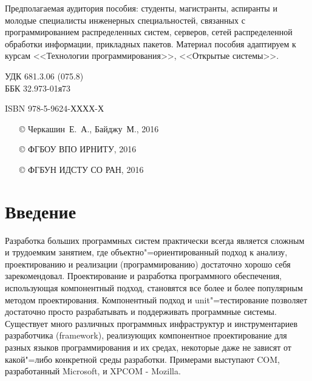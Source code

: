 \documentclass[a4paper,openany,twoside,draft]{book}
\newcommand\e[1]{#1}
\begin{document}
\begin{mygroup}
\begin{minipage}[t]{0.95\linewidth}
Предполагаемая аудитория пособия: студенты, магистранты, аспиранты и молодые специалисты инженерных специальностей, связанных с программированием распределенных систем, серверов, сетей распределенной обработки информации, прикладных пакетов. Материал пособия адаптируем к курсам <<Технологии программирования>>, <<Открытые системы>>.

\mbox{}
\endgroup
\end{minipage}
\mbox{}\hspace{0.7\linewidth}
\begin{minipage}{0.3\linewidth}\small
\noindent УДК 681.3.06 (075.8)\\
\noindent ББК 32.973-01я73
\end{minipage}
\vfill
\vfill
\noindent\begin{minipage}[t]{0.35\linewidth}\small
\noindent \e{ISBN 978-5-9624-ХХХХ-Х}
\end{minipage}%
\begin{minipage}[t]{0.65\linewidth}\small
\begin{itemize}
\setlength{\itemsep}{-0.5ex}
\setlength{\parsep}{0pt}
\item[\copyright{}] Черкашин~Е.~А., Байджу~М., 2016
\item[\copyright{}] ФГБОУ ВПО ИРНИТУ, 2016
\item[\copyright{}] ФГБУН ИДСТУ СО РАН, 2016
\end{itemize}
\end{minipage}
\end{mygroup}
\newpage{}
\label{contents}
\tableofcontents



\chapter{Введение%
  \label{id1}%
}



Разработка больших программных систем практически всегда является сложным и трудоемким занятием, где объектно"=ориентированный подход к анализу, проектированию и реализации (программированию) достаточно хорошо себя зарекомендовал.  Проектирование и разработка программного обеспечения, использующая компонентный подход, становятся все более и более популярным методом проектирования.  Компонентный подход и unit"=тестирование позволяет достаточно просто разрабатывать и поддерживать программные системы.  Существует много различных программных инфраструктур и инструментариев разработчика (framework), реализующих компонентное проектирование для разных языков программирования и их средах, некоторые даже не зависят от какой"=либо конкретной среды разработки.  Примерами выступают COM, разработанный Microsoft, и XPCOM - Mozilla.
\end{document}
